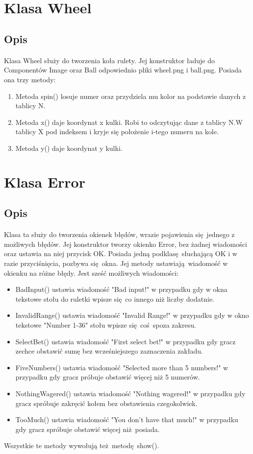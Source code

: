 \documentclass[11pt,a4paper]{article}
\begin{document}
\section{Klasa Wheel}
\subsection{Opis}
\paragraph{}
Klasa Wheel służy do tworzenia koła rulety. Jej konstruktor ładuje do Componentów Image oraz Ball odpowiednio pliki wheel.png i ball.png. Posiada ona trzy metody:
\begin{enumerate}
  \item Metoda spin() losuje numer oraz przydziela mu kolor na podstawie danych z tablicy N.
  \item Metoda x() daje koordynat x kulki. Robi to odczytując dane z tablicy N.W tablicy X pod indeksem i kryje się położenie i-tego numeru na kole.
  \item Metoda y() daje koordynat y kulki.
\end{enumerate}
\section{Klasa Error}
\subsection{Opis}
\paragraph{}
Klasa ta służy do tworzenia okienek błędów, wrazie pojawienia się jednego z możliwych błędów. Jej konstruktor tworzy okienko Error, bez żadnej wiadomości oraz ustawia na niej przycisk OK.
Posiada jedną podklasę słuchającą OK i w razie przyciśnięcia, pozbywa się okna. Jej metody ustawiają wiadomość w okienku na różne błędy.
Jest sześć możliwych wiadomości:
\begin{itemize}
  \item BadInput() ustawia wiadomość "Bad input!" w przypadku gdy w okna tekstowe stołu do ruletki
  wpisze się co innego niż liczby dodatnie.
  \item InvalidRange() ustawia wiadomość "Invalid Range!" w przypadku gdy w okno tekstowe "Number 1-36" stołu wpisze się coś spoza zakresu.
  \item SelectBet() ustawia wiadomość "First select bet!" w przypadku gdy gracz zechce obstawić sumę bez wcześniejszego zaznaczenia zakładu.
  \item FiveNumbers() ustawia wiadomość "Selected more than 5 numbers!" w przypadku gdy gracz próbuje obstawić więcej niż 5 numerów.
  \item NothingWagered() ustawia wiadomość "Nothing wagered!" w przypadku gdy gracz spróbuje zakręcić kołem bez obstawienia czegokolwiek.
  \item TooMuch() ustawia wiadomość "You don't have that much!" w przypadku gdy gracz spróbuje obstawić więcej niż posiada.
\end{itemize}
Wszystkie te metody wywołują też metodę show().
\end{document}
